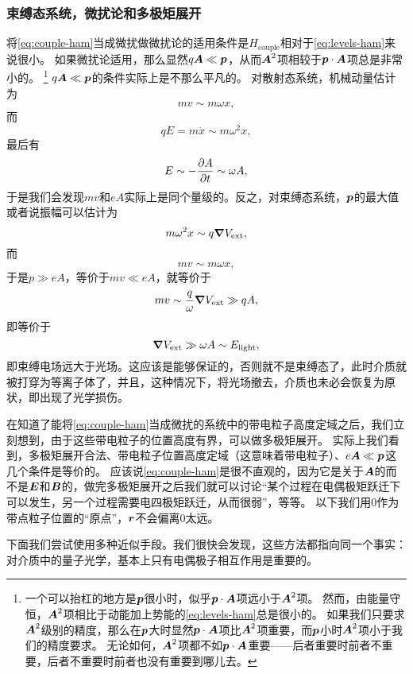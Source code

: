 \subsubsection{束缚态系统，微扰论和多极矩展开}

将\eqref{eq:couple-ham}当成微扰做微扰论的适用条件是$H_\text{couple}$相对于\eqref{eq:levels-ham}来说很小。
如果微扰论适用，那么显然$q \vb*{A} \ll \vb*{p}$，从而$\vb*{A}^2$项相较于$\vb*{p} \cdot \vb*{A}$项总是非常小的。%
\footnote{
    一个可以抬杠的地方是$\vb*{p}$很小时，似乎$\vb*{p} \cdot \vb*{A}$项远小于$\vb*{A}^2$项。
    然而，由能量守恒，$\vb*{A}^2$项相比于动能加上势能的\eqref{eq:levels-ham}总是很小的。
    如果我们只要求$\vb*{A}^2$级别的精度，那么在$\vb*{p}$大时显然$\vb*{p} \cdot \vb*{A}$项比$\vb*{A}^2$项重要，而$\vb*{p}$小时$\vb*{A}^2$项小于我们的精度要求。
    无论如何，$\vb*{A}^2$项都不如$\vb*{p} \cdot \vb*{A}$重要——后者重要时前者不重要，后者不重要时前者也没有重要到哪儿去。
}%
$q \vb*{A} \ll \vb*{p}$的条件实际上是不那么平凡的。
对散射态系统，机械动量估计为
\[
    m v \sim m \omega x,
\]
而
\[
    q E = m \ddot{x} \sim m \omega^2 x,
\]
最后有
\[
    E \sim - \pdv{A}{t} \sim \omega A,
\]
于是我们会发现$mv$和$eA$实际上是同个量级的。反之，对束缚态系统，$\vb*{p}$的最大值或者说振幅可以估计为
\[
    m \omega^2 x \sim q \grad{V_\text{ext}},
\]
而
\[
    mv \sim m \omega x,
\]
于是$p \gg eA$，等价于$mv \ll eA$，就等价于
\[
    mv \sim \frac{q}{\omega} \grad{V_\text{ext}} \gg q A,
\]
即等价于
\begin{equation}
    \grad{V_\text{ext}} \gg \omega A \sim E_\text{light},
\end{equation}
即束缚电场远大于光场。这应该是能够保证的，否则就不是束缚态了，此时介质就被打穿为等离子体了，并且，这种情况下，将光场撤去，介质也未必会恢复为原状，即出现了光学损伤。

在知道了能将\eqref{eq:couple-ham}当成微扰的系统中的带电粒子高度定域之后，我们立刻想到，由于这些带电粒子的位置高度有界，可以做多极矩展开。
实际上我们看到，多极矩展开合法、带电粒子位置高度定域（这意味着带电粒子）、$e \vb*{A} \ll \vb*{p}$这几个条件是等价的。
应该说\eqref{eq:couple-ham}是很不直观的，因为它是关于$\vb*{A}$的而不是$\vb*{E}$和$\vb*{B}$的，做完多极矩展开之后我们就可以讨论“某个过程在电偶极矩跃迁下可以发生，另一个过程需要电四极矩跃迁，从而很弱”，等等。
以下我们用$0$作为带点粒子位置的“原点”，$\vb*{r}$不会偏离$0$太远。

下面我们尝试使用多种近似手段。我们很快会发现，这些方法都指向同一个事实：对介质中的量子光学，基本上只有电偶极子相互作用是重要的。

